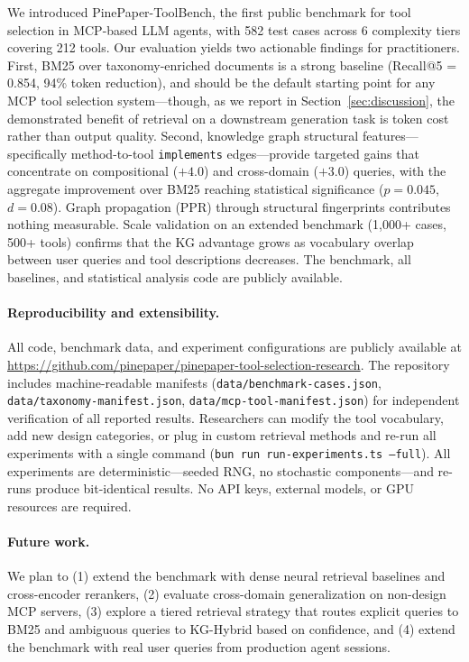 \documentclass[11pt,a4paper]{article}
\begin{document}
We introduced PinePaper-ToolBench, the first public benchmark for tool selection in MCP-based LLM agents, with 582 test cases across 6 complexity tiers covering 212 tools. Our evaluation yields two actionable findings for practitioners. First, BM25 over taxonomy-enriched documents is a strong baseline (Recall@5 = 0.854, 94\% token reduction), and should be the default starting point for any MCP tool selection system---though, as we report in Section~\ref{sec:discussion}, the demonstrated benefit of retrieval on a downstream generation task is token cost rather than output quality. Second, knowledge graph structural features---specifically method-to-tool \texttt{implements} edges---provide targeted gains that concentrate on compositional ($+4.0$) and cross-domain ($+3.0$) queries, with the aggregate improvement over BM25 reaching statistical significance ($p=0.045$, $d=0.08$). Graph propagation (PPR) through structural fingerprints contributes nothing measurable. Scale validation on an extended benchmark (1,000+ cases, 500+ tools) confirms that the KG advantage grows as vocabulary overlap between user queries and tool descriptions decreases. The benchmark, all baselines, and statistical analysis code are publicly available.

\paragraph{Reproducibility and extensibility.}
All code, benchmark data, and experiment configurations are publicly available at \url{https://github.com/pinepaper/pinepaper-tool-selection-research}. The repository includes machine-readable manifests (\texttt{data/benchmark-cases.json}, \texttt{data/taxonomy-manifest.json}, \texttt{data/mcp-tool-manifest.json}) for independent verification of all reported results. Researchers can modify the tool vocabulary, add new design categories, or plug in custom retrieval methods and re-run all experiments with a single command (\texttt{bun run run-experiments.ts --full}). All experiments are deterministic---seeded RNG, no stochastic components---and re-runs produce bit-identical results. No API keys, external models, or GPU resources are required.

\paragraph{Future work.}
We plan to (1) extend the benchmark with dense neural retrieval baselines and cross-encoder rerankers, (2) evaluate cross-domain generalization on non-design MCP servers, (3) explore a tiered retrieval strategy that routes explicit queries to BM25 and ambiguous queries to KG-Hybrid based on confidence, and (4) extend the benchmark with real user queries from production agent sessions.
\end{document}
